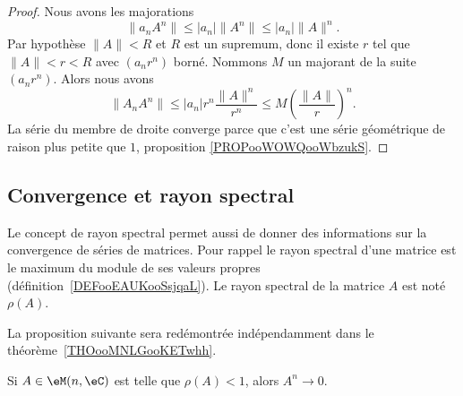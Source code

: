 \begin{proof}
	Nous avons les majorations
	\begin{equation}
		\| a_n A^n\|\leq | a_n |\| A^n \|\leq | a_n |\| A \|^n.
	\end{equation}
	Par hypothèse \( \| A \|<R\) et \( R\) est un supremum, donc il existe \( r\) tel que \( \| A \|<r<R\) avec \( (a_nr^n)\) borné. Nommons \( M\) un majorant de la suite \( (a_nr^n)\). Alors nous avons
	\begin{equation}
		\| A_nA^n \|\leq | a_n |r^n\frac{ \| A \|^n }{ r^n }\leq M\left( \frac{ \| A \| }{ r } \right)^n.
	\end{equation}
	La série du membre de droite converge parce que c'est une série géométrique de raison plus petite que \( 1\), proposition \ref{PROPooWOWQooWbzukS}.
\end{proof}

\subsection{Convergence et rayon spectral}

Le concept de rayon spectral permet aussi de donner des informations sur la convergence de séries de matrices. Pour rappel le rayon spectral d'une matrice est le maximum du module de ses valeurs propres (définition~\ref{DEFooEAUKooSsjqaL}). Le rayon spectral de la matrice \( A\) est noté \( \rho(A)\).

La proposition suivante sera redémontrée indépendamment dans le théorème~\ref{THOooMNLGooKETwhh}.

\begin{proposition}      \label{PROPooDJFLooBqqEPT}
	Si \( A\in \eM(n,\eC)\) est telle que \( \rho(A)<1\), alors \( A^n\to 0\).
\end{proposition}

